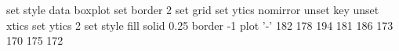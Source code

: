 \begin{gnuplot}[terminal=epslatex,terminaloptions=mono]
	set style data boxplot
	set border 2
	set grid
	set ytics nomirror
	unset key
	unset xtics
	set ytics 2
	set style fill solid 0.25 border -1
	plot '-'
	182
	178
	194
	181
	186
	173
	170
	175
	172
\end{gnuplot}
